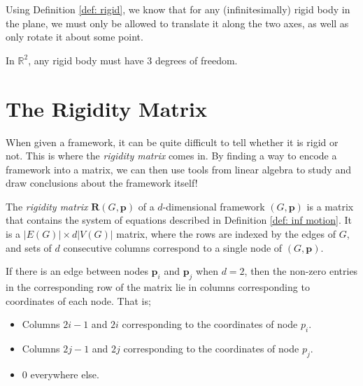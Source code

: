 \begin{flushleft}
Using Definition \ref{def: rigid}, we know that for any (infinitesimally) rigid body in the plane, we must only be allowed to translate it along the two axes, as well as only rotate it about some point.
\end{flushleft}

\begin{theorem}
\label{thm: degrees of rigid body}
In $\mathbb{R}^2$, any rigid body must have $3$ degrees of freedom. 
\end{theorem}

\section{The Rigidity Matrix}

\begin{flushleft}
When given a framework, it can be quite difficult to tell whether it is rigid or not. This is where the \textit{rigidity matrix} comes in. By finding a way to encode a framework into a matrix, we can then use tools from linear algebra to study and draw conclusions about the framework itself!
\end{flushleft}

\begin{definition}
\label{def: rigidity matrix}
The \textit{rigidity matrix} $\mathbf{R}(G,\mathbf{p})$ of a $d$-dimensional framework $(G,\mathbf{p})$ is a matrix that contains the system of equations described in Definition \ref{def: inf motion}. It is a $|E(G)| \times d|V(G)|$ matrix, where the rows are indexed by the edges of $G$, and sets of $d$ consecutive columns correspond to a single node of $(G,\mathbf{p})$. 

\noindent
If there is an edge between nodes $\mathbf{p}_i$ and $\mathbf{p}_j$ when $d=2$, then the non-zero entries in the corresponding row of the matrix lie in columns corresponding to coordinates of each node. That is;
\begin{itemize}
    \item Columns $2i-1$ and $2i$ corresponding to the coordinates of node $p_i$.
    \vspace{-3mm}
    \item Columns $2j-1$ and $2j$ corresponding to the coordinates of node $p_j$.
    \vspace{-3mm}
    \item $0$ everywhere else.
\end{itemize}
\end{definition}

